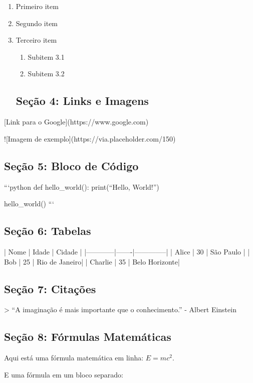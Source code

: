 \begin{enumerate}
	\item Primeiro item
	\item Segundo item
	\item Terceiro item
	\begin{enumerate}
		\item Subitem 3.1
		\item Subitem 3.2
	\end{enumerate}

\subsection*{Seção 4: Links e Imagens}
\end{enumerate}

[Link para o Google](https://www.google.com)

![Imagem de exemplo](https://via.placeholder.com/150)

\subsection*{Seção 5: Bloco de Código}

```python
def hello_world():
    print(``Hello, World!'')

hello_world()
```

\subsection*{Seção 6: Tabelas}

| Nome       | Idade | Cidade       |
|------------|-------|--------------|
| Alice      | 30    | São Paulo    |
| Bob        | 25    | Rio de Janeiro|
| Charlie    | 35    | Belo Horizonte|

\subsection*{Seção 7: Citações}

> ``A imaginação é mais importante que o conhecimento.'' - Albert Einstein

\subsection*{Seção 8: Fórmulas Matemáticas}

Aqui está uma fórmula matemática em linha: \( E = mc^2 \).

E uma fórmula em um bloco separado:

